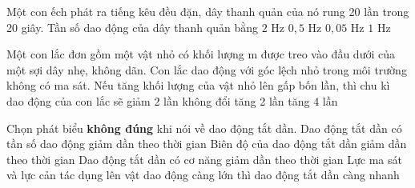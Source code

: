 \begin{ex}%
	Một con ếch phát ra tiếng kêu đều đặn, dây thanh quản của nó rung 20 lần trong 20 giây. Tần số dao động của dây thanh quản bằng
	\choice
	{$2\text{ Hz}$}
	{$0,5\text{ Hz}$}
	{$0,05\text{ Hz}$}
	{\True $1\text{ Hz}$}
\end{ex}

\begin{ex}%
	Một con lắc đơn gồm một vật nhỏ có khối lượng m được treo vào đầu dưới của một sợi dây nhẹ, không dãn. Con lắc dao động với góc lệch nhỏ trong môi trường không có ma sát. Nếu tăng khối lượng của vật nhỏ lên gấp bốn lần, thì chu kì dao động của con lắc sẽ
	\choice
	{giảm 2 lần}
	{\True không đổi}
	{tăng 2 lần}
	{tăng 4 lần}
\end{ex}

\begin{ex}%
	Chọn phát biểu \textbf{không đúng} khi nói về dao động tắt dần.
	\choice
	{\True Dao động tắt dần có tần số dao động giảm dần theo thời gian}
	{Biên độ của dao động tắt dần giảm dần theo thời gian}
	{Dao động tắt dần có cơ năng giảm dần theo thời gian}
	{Lực ma sát và lực cản tác dụng lên vật dao động càng lớn thì dao động tắt dần càng nhanh}
\end{ex}

